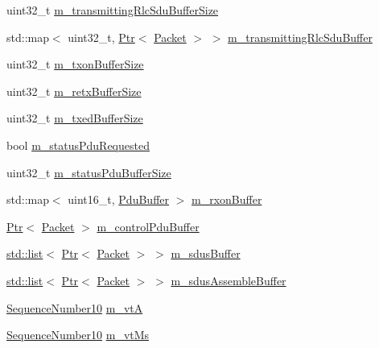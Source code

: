 \begin{DoxyCompactItemize}
\item 
uint32\+\_\+t \hyperlink{classns3_1_1LteRlcAm_a27351db62caae50aabc6b23636a5e0dc}{m\+\_\+transmitting\+Rlc\+Sdu\+Buffer\+Size}
\item 
std\+::map$<$ uint32\+\_\+t, \hyperlink{classns3_1_1Ptr}{Ptr}$<$ \hyperlink{classns3_1_1Packet}{Packet} $>$ $>$ \hyperlink{classns3_1_1LteRlcAm_a3ac00f255ee82f8b0f10b70395b51d6d}{m\+\_\+transmitting\+Rlc\+Sdu\+Buffer}
\item 
uint32\+\_\+t \hyperlink{classns3_1_1LteRlcAm_a3e8db6b5bc1d3fcc215d554e8d347eda}{m\+\_\+txon\+Buffer\+Size}
\item 
uint32\+\_\+t \hyperlink{classns3_1_1LteRlcAm_af270916ffd1805b027a7b9cc05c91e7d}{m\+\_\+retx\+Buffer\+Size}
\item 
uint32\+\_\+t \hyperlink{classns3_1_1LteRlcAm_add3fe05a0fd3a4ad1fcb7db0239c698f}{m\+\_\+txed\+Buffer\+Size}
\item 
bool \hyperlink{classns3_1_1LteRlcAm_afd4ce0824f86cfb394f0492383f98a3b}{m\+\_\+status\+Pdu\+Requested}
\item 
uint32\+\_\+t \hyperlink{classns3_1_1LteRlcAm_a722cecd1994be0d51675dea14b187623}{m\+\_\+status\+Pdu\+Buffer\+Size}
\item 
std\+::map$<$ uint16\+\_\+t, \hyperlink{structns3_1_1LteRlcAm_1_1PduBuffer}{Pdu\+Buffer} $>$ \hyperlink{classns3_1_1LteRlcAm_a7442b4f97fccd0c393dd9f27325a853a}{m\+\_\+rxon\+Buffer}
\item 
\hyperlink{classns3_1_1Ptr}{Ptr}$<$ \hyperlink{classns3_1_1Packet}{Packet} $>$ \hyperlink{classns3_1_1LteRlcAm_a735a20f26634b44104176445de24d995}{m\+\_\+control\+Pdu\+Buffer}
\item 
\hyperlink{openflow-interface_8h_afd9bcfa176617760671b67580f536fa7}{std\+::list}$<$ \hyperlink{classns3_1_1Ptr}{Ptr}$<$ \hyperlink{classns3_1_1Packet}{Packet} $>$ $>$ \hyperlink{classns3_1_1LteRlcAm_abd47ae50bcc975615b87dd53d86efd8e}{m\+\_\+sdus\+Buffer}
\item 
\hyperlink{openflow-interface_8h_afd9bcfa176617760671b67580f536fa7}{std\+::list}$<$ \hyperlink{classns3_1_1Ptr}{Ptr}$<$ \hyperlink{classns3_1_1Packet}{Packet} $>$ $>$ \hyperlink{classns3_1_1LteRlcAm_a075262ee7d8d49e97ab0c48b5e763bf1}{m\+\_\+sdus\+Assemble\+Buffer}
\item 
\hyperlink{classns3_1_1SequenceNumber10}{Sequence\+Number10} \hyperlink{classns3_1_1LteRlcAm_a55514b9f03d8f70cdbb8cdac053f39b5}{m\+\_\+vtA}
\item 
\hyperlink{classns3_1_1SequenceNumber10}{Sequence\+Number10} \hyperlink{classns3_1_1LteRlcAm_a5fcf0776ed7e13952945d41e4b3622c7}{m\+\_\+vt\+Ms}

\end{DoxyCompactItemize}
